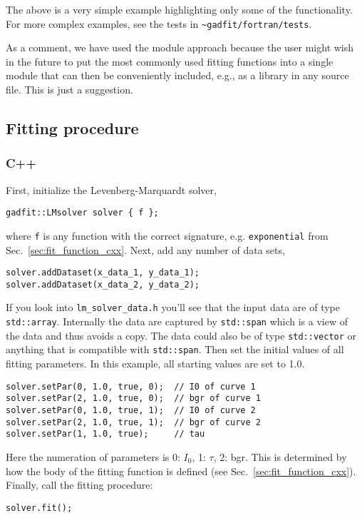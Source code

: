 \documentclass{article}
\begin{document}
The above is a very simple example highlighting only some of the functionality. For more complex examples, see the tests in \verb+~gadfit/fortran/tests+.

As a comment, we have used the module approach because the user might wish in the future to put the most commonly used fitting functions into a single module that can then be conveniently included, e.g., as a library in any source file. This is just a suggestion.

\subsection{Fitting procedure}

\subsubsection{C++}

First, initialize the Levenberg-Marquardt solver,
\begin{verbatim}
gadfit::LMsolver solver { f };
\end{verbatim}
where \texttt{f} is any function with the correct signature, e.g. \texttt{exponential} from Sec.~\ref{sec:fit_function_cxx}. Next, add any number of data sets,
\begin{verbatim}
solver.addDataset(x_data_1, y_data_1);
solver.addDataset(x_data_2, y_data_2);
\end{verbatim}
If you look into \verb+lm_solver_data.h+ you'll see that the input data are of type \texttt{std::array}. Internally the data are captured by \texttt{std::span} which is a view of the data and thus avoids a copy. The data could also be of type \texttt{std::vector} or anything that is compatible with \texttt{std::span}. Then set the initial values of all fitting parameters. In this example, all starting values are set to 1.0.
\begin{verbatim}
solver.setPar(0, 1.0, true, 0);  // I0 of curve 1
solver.setPar(2, 1.0, true, 0);  // bgr of curve 1
solver.setPar(0, 1.0, true, 1);  // I0 of curve 2
solver.setPar(2, 1.0, true, 1);  // bgr of curve 2
solver.setPar(1, 1.0, true);     // tau
\end{verbatim}
Here the numeration of parameters is 0: $I_0$, 1: $\tau$, 2: bgr. This is determined by how the body of the fitting function is defined (see Sec.~\ref{sec:fit_function_cxx}). Finally, call the fitting procedure:
\begin{verbatim}
solver.fit();
\end{verbatim}
\end{document}
